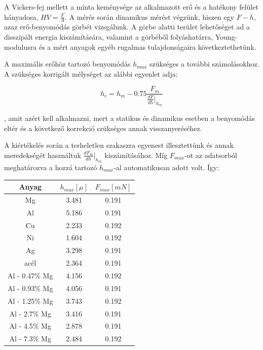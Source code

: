 \documentclass[a4paper,12pt]{article}
\begin{document}
\par A Vickers-fej mellett a minta keménysége az alkalmazott erő és a hatékony felület hányadosa, $HV = \frac{F}{A}$. A mérés során dinamikus mérést végzünk, hiszen egy $F-h$, azaz erő-benyomódás görbét vizsgálunk. A görbe alatti terület lehetőséget ad a disszipált energia kiszámítására, valamint a görbéből folyáshatárra, Young-modulusra és a mért anyagok egyéb rugalmas tulajdonságaira következtethetünk. 

\vspace{5mm}

\par A maximális erőhöz tartozó benyomódás $h_{max}$ szükséges a további számolásokhoz. A szükséges korrigált mélységet az alábbi egyenlet adja:

\begin{equation*}
h_{c} = h_{m} - 0.75\frac{F_{m}}{\frac{dF}{dh}|_{h_{m}}}
\end{equation*}

\par , amit azért kell alkalmazni, mert a statikus és dinamikus esetben a benyomódás eltér és a következő korrekció szükséges annak visszanyeréséhez. 

\par A kiértékelés során a terheletlen szakaszra egyenest illesztettünk és annak meredekségét használtuk $\frac{dF_{m}}{dh}|_{h_{m}}$ kiszámításához. Míg $F_{max}$-ot az adatsorból meghatározva a hozzá tartozó $h_{max}$-al automatikusan adott volt. Így:

\begin{center}
\begin{tabular}{|c|c|c|}
\hline
Anyag & $h_{max} [\mu]$ & $F_{max} [mN]$ \\
\hline
Mg &3.481& 0.191 \\
\hline
Al &5.186 &0.191 \\
\hline
Cu &2.233 &0.192 \\
\hline
Ni &1.604 &0.192 \\
\hline
Ag& 3.298& 0.191 \\
\hline
acél &2.364& 0.191 \\
\hline
Al - 0.47$\%$ Mg &  4.156& 0.192 \\
\hline
Al - 0.93$\%$ Mg& 4.056& 0.191 \\
\hline
Al - 1.25$\%$ Mg& 3.743& 0.192 \\
\hline
Al - 2.7$\%$ Mg &3.416& 0.191 \\
\hline
Al - 4.5$\%$ Mg &2.878& 0.191 \\
\hline
Al - 7.3$\%$ Mg &2.484& 0.192 \\
\hline
\end{tabular}
\end{center}
\end{document}
